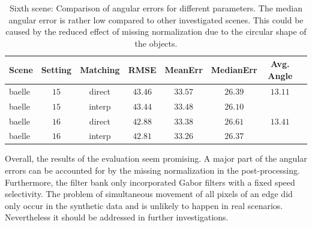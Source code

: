 \begin{table}[tb]
	\centering
		\begin{tabular}{lccccccc}
Scene & Setting & Matching & RMSE & MeanErr & MedianErr & Avg. Angle \\
\hline  \hline
baelle & $15$ & direct & $43.46$ & $33.57$ & $26.39$ & $13.11$ & \\
baelle & $15$ & interp & $43.44$ & $33.48$ & $26.10$ &  & \\
baelle & $16$ & direct & $42.88$ & $33.38$ & $26.61$ & $13.41$ & \\
baelle & $16$ & interp & $42.81$ & $33.26$ & $26.37$ &  & \\
		\end{tabular}
	\caption[Sixth scene: Comparison of angular errors for different parameters.]{Sixth scene: Comparison of angular errors for different parameters.
	The median angular error is rather low compared to other investigated scenes. 
	This could be caused by the reduced effect of missing normalization due to the circular shape of the objects.}
	\label{tab:error_comparison_baelle}
\end{table}


Overall, the results of the evaluation seem promising.
A major part of the angular errors can be accounted for by the missing normalization in the post-processing.
Furthermore, the filter bank only incorporated Gabor filters with a fixed speed selectivity.
The problem of simultaneous movement of all pixels of an edge did only occur in the synthetic data and is unlikely to happen in real scenarios.
Nevertheless it should be addressed in further investigations.
